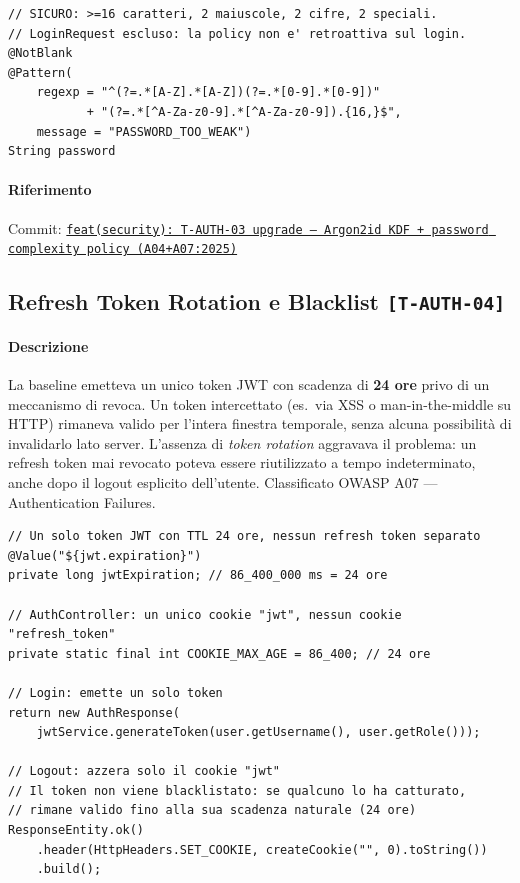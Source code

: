 ﻿\documentclass[a4paper,12pt]{report}
\newcommand{\commitref}[2]{\texttt{\small \href{https://github.com/diegoandruccioli/hotel-pms/commit/#1}{#2}}}
\newcommand{\threat}[1]{\texttt{\small\textcolor{vulnred}{[#1]}}}
\begin{document}
\begin{securebox}[title={Codice Sicuro --- RegisterRequest.java (password complexity)}]
\begin{lstlisting}[style=java]
// SICURO: >=16 caratteri, 2 maiuscole, 2 cifre, 2 speciali.
// LoginRequest escluso: la policy non e' retroattiva sul login.
@NotBlank
@Pattern(
    regexp = "^(?=.*[A-Z].*[A-Z])(?=.*[0-9].*[0-9])"
           + "(?=.*[^A-Za-z0-9].*[^A-Za-z0-9]).{16,}$",
    message = "PASSWORD_TOO_WEAK")
String password
\end{lstlisting}
\end{securebox}

\paragraph{Riferimento} Commit: \commitref{446ad8d}{feat(security): T-AUTH-03 upgrade — Argon2id KDF + password complexity policy (A04+A07:2025)}

\subsection{Refresh Token Rotation e Blacklist \threat{T-AUTH-04}}

\paragraph{Descrizione}
La baseline emetteva un unico token JWT con scadenza di \textbf{24 ore} privo di un meccanismo di
revoca. Un token intercettato (es.\ via XSS o man-in-the-middle su HTTP) rimaneva valido per
l'intera finestra temporale, senza alcuna possibilità di invalidarlo lato server. L'assenza di
\textit{token rotation} aggravava il problema: un refresh token mai revocato poteva essere riutilizzato
a tempo indeterminato, anche dopo il logout esplicito dell'utente.
Classificato OWASP A07 --- Authentication Failures.

\begin{insecurebox}[title={Codice Vulnerabile --- JwtService.java + AuthController.java (baseline)}]
\begin{lstlisting}[style=java]
// Un solo token JWT con TTL 24 ore, nessun refresh token separato
@Value("${jwt.expiration}")
private long jwtExpiration; // 86_400_000 ms = 24 ore

// AuthController: un unico cookie "jwt", nessun cookie "refresh_token"
private static final int COOKIE_MAX_AGE = 86_400; // 24 ore

// Login: emette un solo token
return new AuthResponse(
    jwtService.generateToken(user.getUsername(), user.getRole()));

// Logout: azzera solo il cookie "jwt"
// Il token non viene blacklistato: se qualcuno lo ha catturato,
// rimane valido fino alla sua scadenza naturale (24 ore)
ResponseEntity.ok()
    .header(HttpHeaders.SET_COOKIE, createCookie("", 0).toString())
    .build();
\end{lstlisting}
\end{insecurebox}
\end{document}
